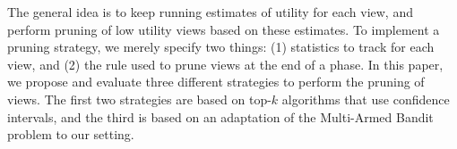 The general idea is to keep running estimates of utility for each view, and
perform pruning of low utility views based on these estimates.
To implement a pruning strategy, we merely specify two things: (1)
statistics to track for each view, and 
(2) the rule used to prune views at the end of a phase.
In this paper, we propose and evaluate three different strategies
to perform the pruning of views. The first two
strategies are based on top-$k$ algorithms that use confidence intervals, and
the third is based on an adaptation of the Multi-Armed Bandit problem to our
setting.
% 


